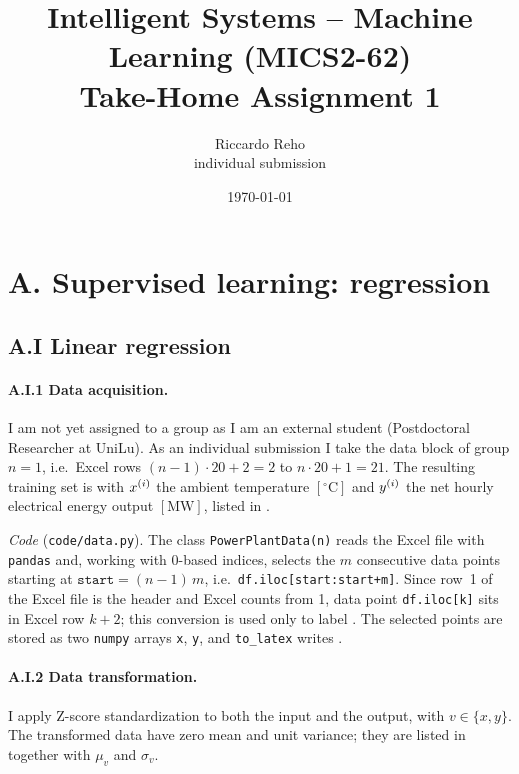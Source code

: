 \documentclass[11pt,a4paper]{article}
\title{Intelligent Systems -- Machine Learning (MICS2-62)\\[2pt]
\large Take-Home Assignment 1}
\author{Riccardo Reho\\ \small individual submission}
\date{\today}
\begin{document}
\maketitle

\section{A. Supervised learning: regression}

\subsection{A.I Linear regression}

\paragraph{A.I.1 Data acquisition.}
I am not yet assigned to a group as I am an external student (Postdoctoral Researcher at UniLu). 
As an individual submission I take the data block of group $n=1$, i.e.\ Excel rows
$(n-1)\cdot 20+2=2$ to $n\cdot 20+1=21$. The resulting training set is
with $x^{(i)}$ the ambient temperature $[^\circ\mathrm{C}]$ and $y^{(i)}$ the net 
hourly electrical energy output $[\mathrm{MW}]$, listed in .

\noindent\emph{Code} (\texttt{code/data.py}). The class \texttt{PowerPlantData(n)} reads the Excel file with
\texttt{pandas} and, working with 0-based indices, selects the $m$ consecutive data points starting at
$\texttt{start}=(n-1)\,m$, i.e.\ \texttt{df.iloc[start:start+m]}. Since row~1 of the Excel file is the header and
Excel counts from 1, data point \texttt{df.iloc[k]} sits in Excel row $k+2$; this conversion is used only to label
. The selected points are stored as two \texttt{numpy} arrays \texttt{x}, \texttt{y}, and
\texttt{to\_latex} writes .

\begin{table}[H]
\centering
\caption{Data set $\mathcal{D}$ of : Excel rows 2--21.}

\end{table}

\paragraph{A.I.2 Data transformation.}
I apply $\mathrm{Z}$-score standardization to both the input and the output,
with $v\in\{x,y\}$. The transformed data have zero mean and unit variance; they are listed in 
together with $\mu_v$ and $\sigma_v$.
\end{document}
